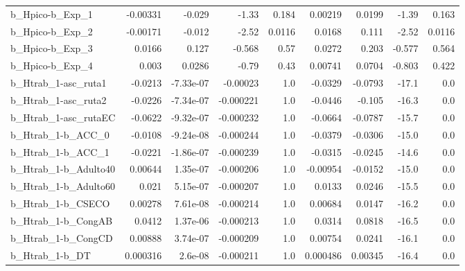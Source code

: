 \begin{tabular}{lrrrrrrrr}
b\_Hpico-b\_Exp\_1            &    -0.00331 &       -0.029 &     -1.33 &    0.184 &    0.00219 &      0.0199 &        -1.39 &         0.163 \\
b\_Hpico-b\_Exp\_2            &    -0.00171 &       -0.012 &     -2.52 &   0.0116 &     0.0168 &       0.111 &        -2.52 &        0.0116 \\
b\_Hpico-b\_Exp\_3            &      0.0166 &        0.127 &    -0.568 &     0.57 &     0.0272 &       0.203 &       -0.577 &         0.564 \\
b\_Hpico-b\_Exp\_4            &       0.003 &       0.0286 &     -0.79 &     0.43 &    0.00741 &      0.0704 &       -0.803 &         0.422 \\
b\_Htrab\_1-asc\_ruta1        &     -0.0213 &    -7.33e-07 &  -0.00023 &      1.0 &    -0.0329 &     -0.0793 &        -17.1 &           0.0 \\
b\_Htrab\_1-asc\_ruta2        &     -0.0226 &    -7.34e-07 & -0.000221 &      1.0 &    -0.0446 &      -0.105 &        -16.3 &           0.0 \\
b\_Htrab\_1-asc\_rutaEC       &     -0.0622 &    -9.32e-07 & -0.000232 &      1.0 &    -0.0664 &     -0.0787 &        -15.7 &           0.0 \\
b\_Htrab\_1-b\_ACC\_0          &     -0.0108 &    -9.24e-08 & -0.000244 &      1.0 &    -0.0379 &     -0.0306 &        -15.0 &           0.0 \\
b\_Htrab\_1-b\_ACC\_1          &     -0.0221 &    -1.86e-07 & -0.000239 &      1.0 &    -0.0315 &     -0.0245 &        -14.6 &           0.0 \\
b\_Htrab\_1-b\_Adulto40       &     0.00644 &     1.35e-07 & -0.000206 &      1.0 &   -0.00954 &     -0.0152 &        -15.0 &           0.0 \\
b\_Htrab\_1-b\_Adulto60       &       0.021 &     5.15e-07 & -0.000207 &      1.0 &     0.0133 &      0.0246 &        -15.5 &           0.0 \\
b\_Htrab\_1-b\_CSECO          &     0.00278 &     7.61e-08 & -0.000214 &      1.0 &    0.00684 &      0.0147 &        -16.2 &           0.0 \\
b\_Htrab\_1-b\_CongAB         &      0.0412 &     1.37e-06 & -0.000213 &      1.0 &     0.0314 &      0.0818 &        -16.5 &           0.0 \\
b\_Htrab\_1-b\_CongCD         &     0.00888 &     3.74e-07 & -0.000209 &      1.0 &    0.00754 &      0.0241 &        -16.1 &           0.0 \\
b\_Htrab\_1-b\_DT             &    0.000316 &      2.6e-08 & -0.000211 &      1.0 &   0.000486 &     0.00345 &        -16.4 &           0.0 \\

\end{tabular}
